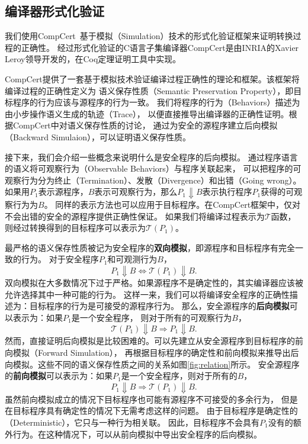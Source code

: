 \subsection{编译器形式化验证} \label{sec:compcertbackend}

我们使用CompCert~\cite{leroy2009formally}基于模拟（Simulation）技术的形式化验证框架来证明转换过程的正确性。
经过形式化验证的C语言子集编译器CompCert是由INRIA的Xavier Leroy领导开发的，在Coq定理证明工具中实现。

CompCert提供了一套基于模拟技术验证编译过程正确性的理论和框架。该框架将编译过程的正确性定义为
语义保存性质（Semantic Preservation Property），即目标程序的行为应该与源程序的行为一致。
我们将程序的行为（Behaviors）描述为由小步操作语义生成的轨迹（Trace），
以便直接推导出编译器的正确性证明。根据CompCert中对语义保存性质的讨论，
通过为安全的源程序建立后向模拟（Backward Simulaion），可以证明语义保存性质。

接下来，我们会介绍一些概念来说明什么是安全程序的后向模拟。
通过程序语言的语义将可观察行为（Observable Behaviors）与程序关联起来，
可以把程序的可观察行为分为终止（Termination）、发散（Divergence）和出错（Going wrong）。
如果用$P_1$表示源程序，$B$表示可观察行为，那么$P_1 \Downarrow B$表示执行程序$P_1$获得的可观察行为为$B$。
同样的表示方法也可以应用于目标程序。在CompCert框架中，仅对不会出错的安全的源程序提供正确性保证。
如果我们将编译过程表示为$\mathcal{T}$函数，则经过转换得到的目标程序可以表示为$\mathcal{T}(P_1)$。

最严格的语义保存性质被记为安全程序的\textbf{双向模拟}，即源程序和目标程序有完全一致的行为。
对于安全程序$P_1$和可观测行为$B$，
\begin{equation}
    P_1 \Downarrow B \Longleftrightarrow \mathcal{T}(P_1) \Downarrow B.
\end{equation}
双向模拟在大多数情况下过于严格。如果源程序不是确定性的，其实编译器应该被允许选择其中一种可能的行为。
这样一来，我们可以将编译安全程序的正确性描述为：目标程序的行为是可接受的源程序行为。
那么，安全源程序的\textbf{后向模拟}可以表示为：如果$P_1$是一个安全程序，
则对于所有的可观察行为$B$，
\begin{equation}
    \mathcal{T}(P_1) \Downarrow B \Longrightarrow P_1 \Downarrow B.
\end{equation}
然而，直接证明后向模拟是比较困难的。可以先建立从安全源程序到目标程序的前向模拟（Forward Simulation），
再根据目标程序的确定性和前向模拟来推导出后向模拟。这些不同的语义保存性质之间的关系如图\ref{fig:relation}所示。
安全源程序的\textbf{前向模拟}可以表示为：如果$P_1$是一个安全程序，则对于所有的$B$，
\begin{equation}
P_1 \Downarrow B \Longrightarrow \mathcal{T}(P_1) \Downarrow B.
\end{equation}
虽然前向模拟成立的情况下目标程序也可能有源程序不可接受的多余行为，
但是在目标程序具有确定性的情况下无需考虑这样的问题。
由于目标程序是确定性的（Deterministic），它只与一种行为相关联。
因此，目标程序不会具有$P_1$没有的额外行为。在这种情况下，可以从前向模拟中导出安全程序的后向模拟。

